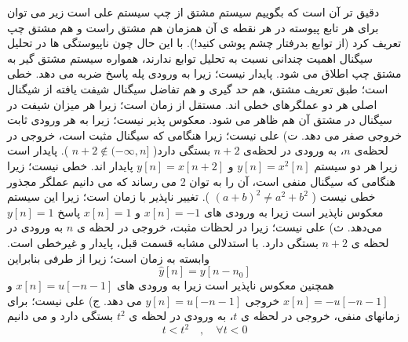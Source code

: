 \documentclass[10pt,letterpaper]{article}
\newcommand{\nl}{\newline\newline}
\begin{document}
دقیق تر آن است که بگوییم سیستم مشتق از چپ سیستم علی است زیر می توان برای هر تابع پیوسته در هر نقطه ی آن همزمان هم مشتق راست و هم مشتق چپ تعریف کرد (از توابع بدرفتار چشم پوشی کنید!). با این حال چون ناپیوستگی ها در تحلیل سیگنال اهمیت چندانی نسبت به تحلیل توابع ندارند، همواره سیستم مشتق گیر به مشتق چپ اطلاق می شود.
\nl
پایدار نیست؛ زیرا به ورودی پله پاسخ ضربه می دهد.
\nl
خطی است؛ طبق تعریف مشتق، هم حد گیری و هم تفاضل سیگنال شیفت یافته از شیگنال اصلی هر دو عملگرهای خطی اند.
\nl
مستقل از زمان است؛ زیرا هر میزان شیفت در سیگنال در مشتق آن هم ظاهر می شود.
\nl
معکوس پذیر نیست؛ زیرا به هر ورودی ثابت خروجی صفر می دهد.
\nl
ت) علی نیست؛ زیرا هنگامی که سیگنال مثبت است، خروجی در لحظه‌ی $n$، به ورودی در لحظه‌ی $n+2$ بستگی دارد(
$
n+2\notin (-\infty ,n]
$
).
\nl
پایدار است زیرا هر دو سیستم 
$
y[n]=x^2[n]
$
 و 
$
y[n]=x[n+2]
$
 پایدار اند.
خطی نیست؛ زیرا هنگامی که سیگنال منفی است، آن را به توان 2 می رساند که می دانیم عملگر مجذور خطی نیست
(
$(a+b)^2\ne a^2+b^2$
).
\nl
تغییر ناپذیر با زمان است؛ زیرا
این سیستم معکوس ناپذیر است زیرا به ورودی های 
$
x[n]=-1
$
 و 
$
x[n]=1
$
 پاسخ 
$
y[n]=1
$
 می‌دهد.
\nl
ث) علی نیست؛ زیرا در لحظات مثبت، خروجی در لحظه ی $n$ به ورودی در لحظه ی $n+2$ بستگی دارد.
\nl
با استدلالی مشابه قسمت قبل، پایدار و غیرخطی است.
\nl
وابسته به زمان است؛ زیرا
از طرفی 
بنابراین
$$
\hat y[n]=y[n-n_0]
$$
همچنین معکوس ناپذیر است زیرا به ورودی های 
$
x[n]=u[-n-1]
$
 و 
$
x[n]=-u[-n-1]
$
 خروجی 
$
y[n]=u[-n-1]
$
 می دهد.
\nl
ج) علی نیست؛ برای زمانهای منفی، خروجی در لحظه ی $t$، به ورودی در لحظه ی $t^2$ بستگی دارد و می دانیم
$$
t<t^2\quad,\quad \forall t<0
$$
\end{document}
